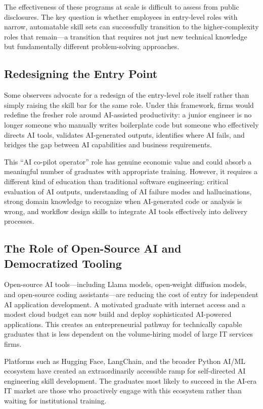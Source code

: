 \documentclass[conference]{IEEEtran}
\begin{document}
The effectiveness of these programs at scale is difficult to assess from public disclosures. The key question is whether employees in entry-level roles with narrow, automatable skill sets can successfully transition to the higher-complexity roles that remain---a transition that requires not just new technical knowledge but fundamentally different problem-solving approaches.

\subsection{Redesigning the Entry Point}

Some observers advocate for a redesign of the entry-level role itself rather than simply raising the skill bar for the same role. Under this framework, firms would redefine the fresher role around AI-assisted productivity: a junior engineer is no longer someone who manually writes boilerplate code but someone who effectively directs AI tools, validates AI-generated outputs, identifies where AI fails, and bridges the gap between AI capabilities and business requirements.

This ``AI co-pilot operator'' role has genuine economic value and could absorb a meaningful number of graduates with appropriate training. However, it requires a different kind of education than traditional software engineering: critical evaluation of AI outputs, understanding of AI failure modes and hallucinations, strong domain knowledge to recognize when AI-generated code or analysis is wrong, and workflow design skills to integrate AI tools effectively into delivery processes.

\subsection{The Role of Open-Source AI and Democratized Tooling}

Open-source AI tools---including Llama models, open-weight diffusion models, and open-source coding assistants---are reducing the cost of entry for independent AI application development. A motivated graduate with internet access and a modest cloud budget can now build and deploy sophisticated AI-powered applications. This creates an entrepreneurial pathway for technically capable graduates that is less dependent on the volume-hiring model of large IT services firms.

Platforms such as Hugging Face, LangChain, and the broader Python AI/ML ecosystem have created an extraordinarily accessible ramp for self-directed AI engineering skill development. The graduates most likely to succeed in the AI-era IT market are those who proactively engage with this ecosystem rather than waiting for institutional training.
\end{document}
